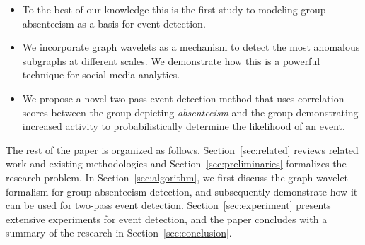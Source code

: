 \begin{itemize}
\item To the best of our knowledge this is the first study to modeling group absenteeism as a basis for event detection.

\item We incorporate graph wavelets as a mechanism to detect the most anomalous subgraphs at different scales. We demonstrate how this is a powerful technique for social media analytics.

\item We propose a novel two-pass event detection method that uses correlation scores between the group depicting \textit{absenteeism} and the group demonstrating increased activity to probabilistically determine the likelihood of an event.
\end{itemize}

The rest of the paper is organized as follows. Section~\ref{sec:related} reviews related work and existing methodologies and Section~\ref{sec:preliminaries} formalizes the research problem. In Section~\ref{sec:algorithm}, we first discuss the graph wavelet formalism for group absenteeism detection, and subsequently demonstrate how it can be used for two-pass event detection. Section~\ref{sec:experiment} presents extensive experiments for event detection, and the paper concludes with a summary of the research in Section~\ref{sec:conclusion}.



